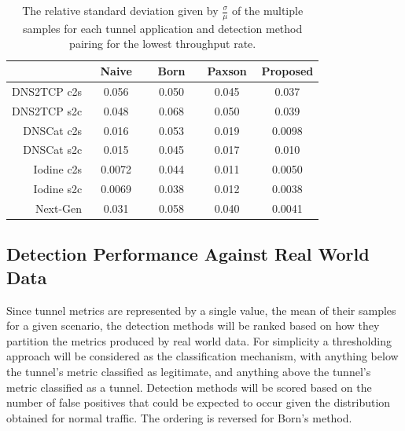 \documentclass{llncs}
\begin{document}
\begin{table}[ht]
\centering
\begin{tabular}{r|cccc}
& \,\,\,\,Naive\,\,\,\, & \,\,\,\,Born\,\,\,\, & \,\,Paxson\,\, & Proposed \\
\hline
DNS2TCP c2s & 0.056 & 0.050 & 0.045 & 0.037 \\
DNS2TCP s2c & 0.048 & 0.068 & 0.050 & 0.039 \\
DNSCat c2s & 0.016 & 0.053 & 0.019 & 0.0098 \\
DNSCat s2c & 0.015 & 0.045 & 0.017 & 0.010 \\
Iodine c2s & 0.0072 & 0.044 & 0.011 & 0.0050 \\
Iodine s2c & 0.0069 & 0.038 & 0.012 & 0.0038 \\
Next-Gen & 0.031 & 0.058 & 0.040 & 0.0041 \\
\end{tabular}
\caption[Relative Standard Deviation of Lowest Throughput Tunnel by Detection Method and Tunnel Application]{The relative standard deviation given by $\frac{\sigma}{\mu}$ of the multiple samples for each tunnel application and detection method pairing for the lowest throughput rate.}
\label{rsd-minimum}
\end{table}

\subsection{Detection Performance Against Real World Data}
\label{detection-perf}

Since tunnel metrics are represented by a single value, the mean of their
samples for a given scenario, the detection methods will be ranked based on how
they partition the metrics produced by real world data. For simplicity a
thresholding approach will be considered as the classification mechanism, with
anything below the tunnel's metric classified as legitimate, and anything above
the tunnel's metric classified as a tunnel. Detection methods will be scored
based on the number of false positives that could be expected to occur given the
distribution obtained for normal traffic. The ordering is reversed for Born's method.
\end{document}
